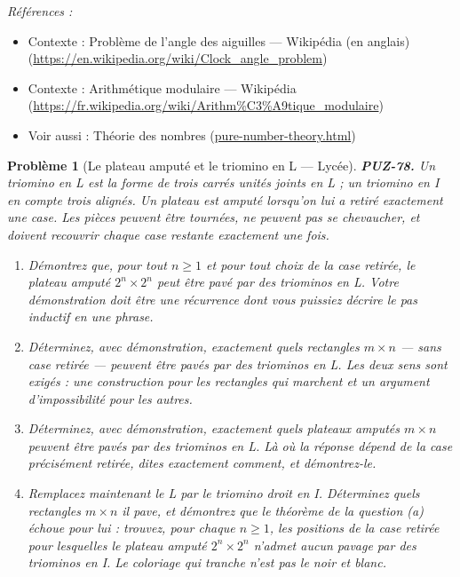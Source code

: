 \documentclass[11pt]{article}
\newtheorem{problem}{Problème}
\newenvironment{refs}{\par\small\noindent\emph{Références :}\begin{itemize}\setlength\itemsep{0pt}}{\end{itemize}\normalsize}
\begin{document}
\begin{refs}
\item Contexte : Problème de l'angle des aiguilles --- Wikipédia (en anglais) (\url{https://en.wikipedia.org/wiki/Clock_angle_problem})
\item Contexte : Arithmétique modulaire --- Wikipédia (\url{https://fr.wikipedia.org/wiki/Arithm%C3%A9tique_modulaire})
\item Voir aussi : Théorie des nombres (\url{pure-number-theory.html})
\end{refs}

\bigskip

\begin{problem}[{Le plateau amputé et le triomino en L --- Lycée}]
\textbf{PUZ-78.} Un \textit{triomino en L} est la forme de trois carrés unités joints en L ;
un \textit{triomino en I} en compte trois alignés. Un plateau est \textit{amputé} lorsqu'on lui a
retiré exactement une case. Les pièces peuvent être tournées, ne peuvent pas se chevaucher,
et doivent recouvrir chaque case restante exactement une fois.
\begin{enumerate}
\item[(a)] Démontrez que, pour tout $ n \ge 1 $ et pour tout choix de la case retirée, le plateau
amputé $ 2^{n} \times 2^{n} $ peut être pavé par des triominos en L. Votre démonstration
doit être une récurrence dont vous puissiez décrire le pas inductif en une phrase.
\item[(b)] Déterminez, avec démonstration, exactement quels rectangles $ m \times n $ --- sans case
retirée --- peuvent être pavés par des triominos en L. Les deux sens sont exigés : une
construction pour les rectangles qui marchent et un argument d'impossibilité pour les
autres.
\item[(c)] Déterminez, avec démonstration, exactement quels plateaux amputés $ m \times n $
peuvent être pavés par des triominos en L. Là où la réponse dépend de la case
\textit{précisément} retirée, dites exactement comment, et démontrez-le.
\item[(d)] Remplacez maintenant le L par le triomino droit en I. Déterminez quels rectangles
$ m \times n $ il pave, et démontrez que le théorème de la question (a) échoue pour lui :
trouvez, pour chaque $ n \ge 1 $, les positions de la case retirée pour lesquelles le
plateau amputé $ 2^{n} \times 2^{n} $ n'admet aucun pavage par des triominos en I. Le
coloriage qui tranche n'est pas le noir et blanc.
\end{enumerate}

\end{problem}
\end{document}
